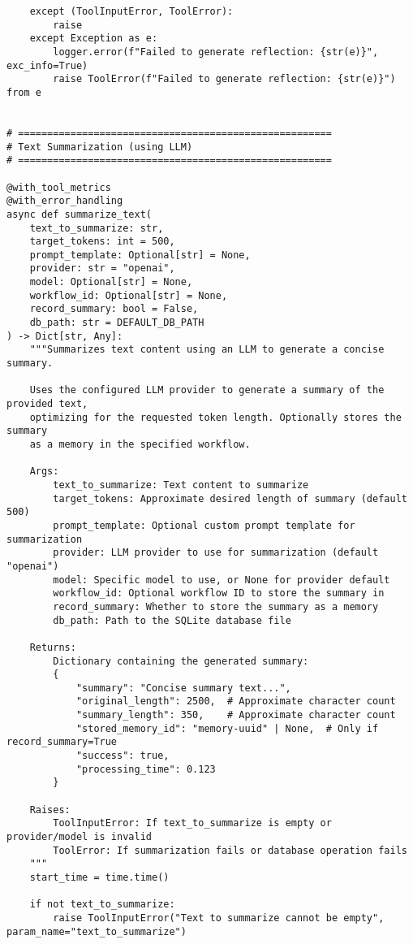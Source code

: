 \documentclass[12pt,a4paper]{article}
\begin{document}
\begin{pageablecode}
\begin{verbatim}
    except (ToolInputError, ToolError):
        raise
    except Exception as e:
        logger.error(f"Failed to generate reflection: {str(e)}", exc_info=True)
        raise ToolError(f"Failed to generate reflection: {str(e)}") from e


# ======================================================
# Text Summarization (using LLM)
# ======================================================

@with_tool_metrics
@with_error_handling
async def summarize_text(
    text_to_summarize: str,
    target_tokens: int = 500,
    prompt_template: Optional[str] = None,
    provider: str = "openai",
    model: Optional[str] = None,
    workflow_id: Optional[str] = None,
    record_summary: bool = False,
    db_path: str = DEFAULT_DB_PATH
) -> Dict[str, Any]:
    """Summarizes text content using an LLM to generate a concise summary.
    
    Uses the configured LLM provider to generate a summary of the provided text,
    optimizing for the requested token length. Optionally stores the summary
    as a memory in the specified workflow.
    
    Args:
        text_to_summarize: Text content to summarize
        target_tokens: Approximate desired length of summary (default 500)
        prompt_template: Optional custom prompt template for summarization
        provider: LLM provider to use for summarization (default "openai")
        model: Specific model to use, or None for provider default
        workflow_id: Optional workflow ID to store the summary in
        record_summary: Whether to store the summary as a memory
        db_path: Path to the SQLite database file
        
    Returns:
        Dictionary containing the generated summary:
        {
            "summary": "Concise summary text...",
            "original_length": 2500,  # Approximate character count
            "summary_length": 350,    # Approximate character count
            "stored_memory_id": "memory-uuid" | None,  # Only if record_summary=True
            "success": true,
            "processing_time": 0.123
        }
        
    Raises:
        ToolInputError: If text_to_summarize is empty or provider/model is invalid
        ToolError: If summarization fails or database operation fails
    """
    start_time = time.time()
    
    if not text_to_summarize:
        raise ToolInputError("Text to summarize cannot be empty", param_name="text_to_summarize")
    

\end{verbatim}
\end{pageablecode}
\end{document}
